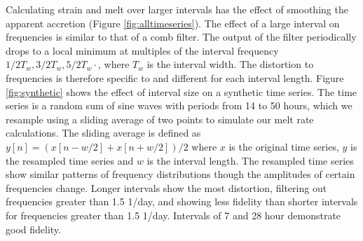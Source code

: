Calculating strain and melt over larger intervals has the effect of smoothing the apparent accretion (Figure \ref{fig:alltimeseries}). The effect of a large interval on frequencies is similar to that of a comb filter. The output of the filter periodically drops to a local minimum at multiples of the interval frequency $1 / 2T_w, 3 / 2T_w, 5 / 2T_w \cdot$, where $T_w$ is the interval width. The distortion to frequencies is therefore specific to and different for each interval length. Figure \ref{fig:synthetic} shows the effect of interval size on a synthetic time series. The time series is a random sum of sine waves with periods from 14 to 50 hours, which we resample using a sliding average of two points to simulate our melt rate calculations. The sliding average is defined as $y[n] = (x[n-w/2]+x[n+w/2])/2$ where $x$ is the original time series, $y$ is the resampled time series and $w$ is the interval length. The resampled time series show similar patterns of frequency distributions though the amplitudes of certain frequencies change. Longer intervals show the most distortion, filtering out frequencies greater than 1.5 1/day, and showing less fidelity than shorter intervals for frequencies greater than 1.5 1/day. Intervals of 7 and 28 hour demonstrate good fidelity.


